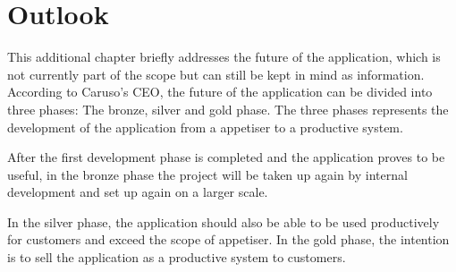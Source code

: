 \chapter{Outlook}
This additional chapter briefly addresses the future of the application, which is not currently part of the scope but can still be kept in mind as information. 
According to Caruso's CEO, the future of the application can be divided into three phases: The bronze, silver and gold phase.
The three phases represents the development of the application from a \gls{appetiser} to a productive system.

After the first development phase is completed and the application proves to be useful, in the bronze phase the project will be taken up again by internal development and set up again on a larger scale.

In the silver phase, the application should also be able to be used productively for customers and exceed the scope of \gls{appetiser}.
In the gold phase, the intention is to sell the application as a productive system to customers.